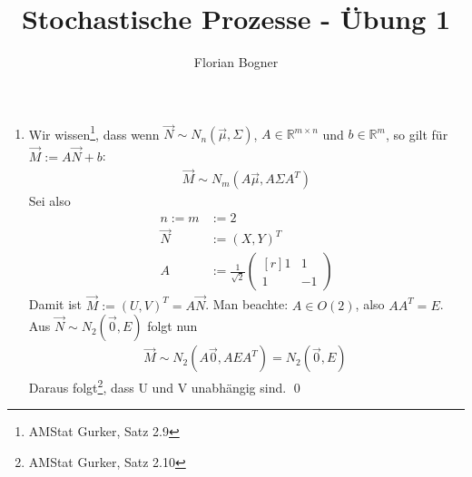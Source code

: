\documentclass[11pt,a4paper,fullpage]{article}
\begin{document}
\author{Florian Bogner}
\title{Stochastische Prozesse - Übung 1}
\maketitle

\begin{enumerate}
\item Wir wissen\footnote{AMStat Gurker, Satz 2.9}, dass wenn $\vec N \sim N_n\left(\vec\mu, \Sigma\right)$, $A \in \mathbb R^{m\times n}$ und $b \in \mathbb R^m$, so gilt für $\vec M := A \vec N + b$:
\begin{align*}
\vec M \sim N_m\left(A\vec\mu, A\Sigma A^T\right)
\end{align*}
Sei also
\begin{align*}
n := m &:= 2 \\
\vec N &:= \left(X, Y\right)^T \\
A &:= \frac{1}{\sqrt 2}\begin{pmatrix*}\left[r\right]
1 & 1 \\
1 & -1 
\end{pmatrix*}
\end{align*}
Damit ist $\vec M := \left(U, V\right)^T = A\vec N$. Man beachte: $A \in O\left(2\right)$, also $AA^T = E$. Aus $\vec N \sim N_2\left(\vec 0, E\right)$ folgt nun
\begin{align*}
\vec M \sim N_2\left(A\vec 0, A E A^T\right) = N_2\left(\vec 0, E\right)\
\end{align*}
Daraus folgt\footnote{AMStat Gurker, Satz 2.10}, dass U und V unabhängig sind. \qed


\end{enumerate}
\end{document}
